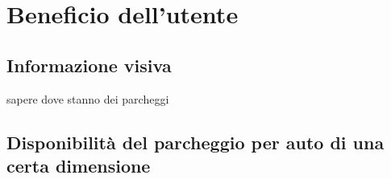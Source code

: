 

\section{Beneficio dell'utente} 

\subsection{Informazione visiva}

sapere dove stanno dei parcheggi

\subsection{Disponibilità del parcheggio per auto di una certa dimensione}
